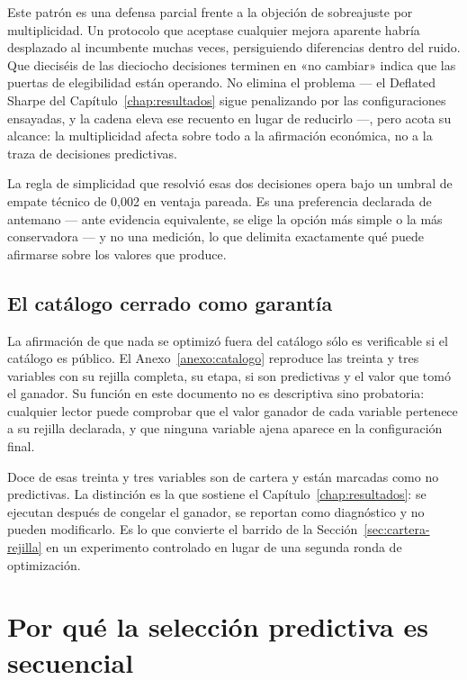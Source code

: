 Este patrón es una defensa parcial frente a la objeción de sobreajuste por multiplicidad. Un
protocolo que aceptase cualquier mejora aparente habría desplazado al incumbente muchas veces,
persiguiendo diferencias dentro del ruido. Que dieciséis de las dieciocho decisiones terminen en «no cambiar»
indica que las puertas de elegibilidad están operando. No elimina el problema --- el
Deflated Sharpe del Capítulo~\ref{chap:resultados} sigue penalizando por las configuraciones
ensayadas, y la cadena eleva ese recuento en lugar de reducirlo ---, pero acota su alcance: la
multiplicidad afecta sobre todo a la afirmación económica, no a la traza de decisiones predictivas.

La regla de simplicidad que resolvió esas dos decisiones opera bajo un umbral de empate técnico de
0,002 en ventaja pareada. Es una preferencia declarada de antemano --- ante evidencia equivalente,
se elige la opción más simple o la más conservadora --- y no una medición, lo que delimita
exactamente qué puede afirmarse sobre los valores que produce.

\subsection*{El catálogo cerrado como garantía}

La afirmación de que nada se optimizó fuera del catálogo sólo es verificable si el catálogo es
público. El Anexo~\ref{anexo:catalogo} reproduce las treinta y tres variables con su rejilla
completa, su etapa, si son predictivas y el valor que tomó el ganador. Su función en este documento
no es descriptiva sino probatoria: cualquier lector puede comprobar que el valor ganador de cada
variable pertenece a su rejilla declarada, y que ninguna variable ajena aparece en la configuración
final.

Doce de esas treinta y tres variables son de cartera y están marcadas como no predictivas. La
distinción es la que sostiene el Capítulo~\ref{chap:resultados}: se ejecutan después de congelar el
ganador, se reportan como diagnóstico y no pueden modificarlo. Es lo que convierte el barrido de la
Sección~\ref{sec:cartera-rejilla} en un experimento controlado en lugar de una segunda ronda de
optimización.

\section{Por qué la selección predictiva es secuencial}
\label{sec:seleccion-secuencial}

